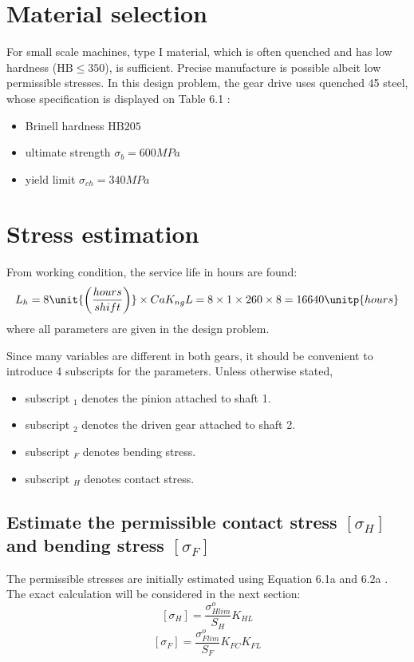 \section{Material selection}
For small scale machines, type I material, which is often quenched and has low hardness ($ \text{HB}\leq 350 $), is sufficient. Precise manufacture is possible albeit low permissible stresses. In this design problem, the gear drive uses quenched 45 steel, whose specification is displayed on Table 6.1 \cite{tk1}:
\begin{itemize}
	\item Brinell hardness $ \text{HB} 205 $
	\item ultimate strength $ \sigma_b = 600\unit{MPa} $
	\item yield limit $ \sigma_{ch} = 340 \unit{MPa}$
\end{itemize}

\section{Stress estimation}
From working condition, the service life in hours are found:
\[L_h = 8\unit{\left( \dfrac{hours}{shift}\right)}\times Ca  K_{ng} L= 8 \times 1\times 260\times 8 = 16640\unitp{hours}\]
where all parameters are given in the design problem.

Since many variables are different in both gears, it should be convenient to introduce 4 subscripts for the parameters. Unless otherwise stated,
\begin{itemize}
	\item subscript $ _1 $ denotes the pinion attached to shaft 1.
	\item subscript $ _2 $ denotes the driven gear attached to shaft 2.
	\item subscript $ _F $ denotes bending stress.
	\item subscript $ _H $ denotes contact stress.
\end{itemize}
\subsection{Estimate the permissible contact stress $ [\sigma_H] $ and bending stress $ [\sigma_F] $}
The permissible stresses are initially estimated using Equation 6.1a and 6.2a \cite{tk1}. The exact calculation will be considered in the next section:
\[[\sigma_H]=\dfrac{\sigma_{Hlim}^o}{S_H}K_{HL}\]
\[[\sigma_F]=\dfrac{\sigma_{Flim}^o}{S_F}K_{FC}K_{FL}\]


